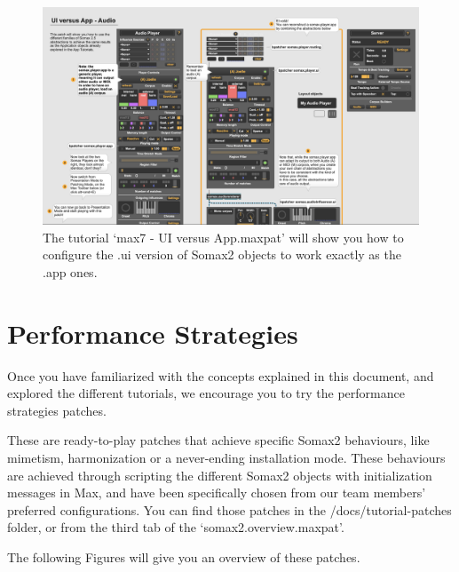 \begin{figure}[H]
    \centering        
 	\includegraphics[width=1\textwidth]{img/ui_vs_app_tuto.png}
    \caption{The tutorial `max7 - UI versus App.maxpat' will show you how to configure the .ui version of Somax2 objects to work exactly as the .app ones.}
    \label{fig:ui_vs_app_tuto}
\end{figure}



\section{Performance Strategies}
Once you have familiarized with the concepts explained in this document, and explored the different tutorials, we encourage you to try the performance strategies patches.

These are ready-to-play patches that achieve specific Somax2 behaviours, like mimetism, harmonization or a never-ending installation mode. These behaviours are achieved through scripting the different Somax2 objects with initialization messages in Max, and have been specifically chosen from our team members' preferred configurations. You can find those patches in the /docs/tutorial-patches folder, or from the third tab of the `somax2.overview.maxpat'.

The following Figures will give you an overview of these patches.

\vspace{20mm}

